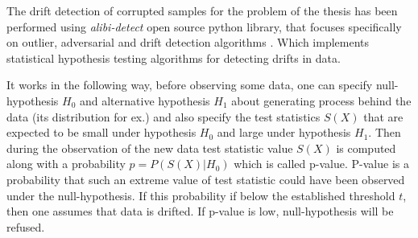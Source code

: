 The drift detection of corrupted samples for the problem of the thesis has been performed using \textit{alibi-detect} open source python library, that focuses specifically on outlier, adversarial and drift detection algorithms \cite{alibi-detect}. Which implements statistical hypothesis testing algorithms for detecting drifts in data. 

It works in the following way, before observing some data, one can specify null-hypothesis $H_0$ and alternative hypothesis $H_1$ about generating process behind the data (its distribution for ex.) and also specify the test statistics $S(X)$ that are expected to be small under hypothesis $H_0$ and large under hypothesis $H_1$. Then during the observation of the new data test statistic value $S(X)$ is computed along with a probability $p = P(S(X)|H_0)$ which is called p-value. P-value is a probability that such an extreme value of test statistic could have been observed under the null-hypothesis. If this probability if below the established threshold $t$, then one assumes that data is drifted. If p-value is low, null-hypothesis will be refused. 

